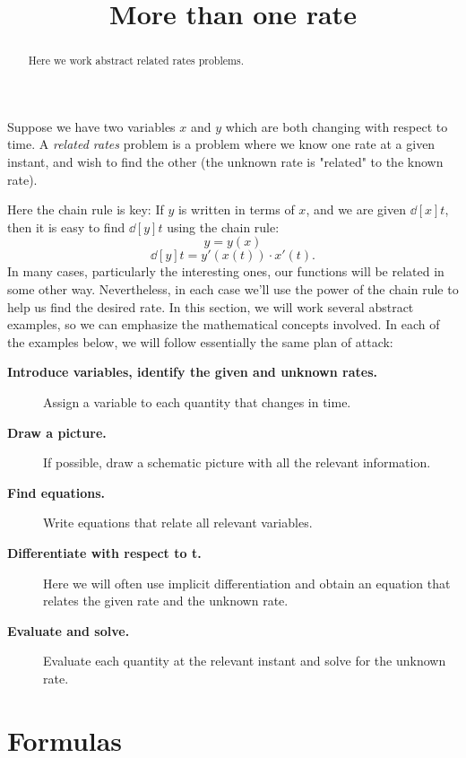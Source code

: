 \documentclass{ximera}
\title[Dig-In:]{More than one rate}
\begin{document}
\begin{abstract}
  Here we work abstract related rates problems.
\end{abstract}
\maketitle


Suppose we have two variables $x$ and $y$ which are both changing with
respect to time.  A \textit{related rates} problem is a problem where
we know one rate at a given instant, and wish to find the other (the unknown rate is "related" to the known rate).

Here the chain rule is key: If $y$ is written in terms of $x$, and we
are given $\dd[x]{t}$, then it is easy to find $\dd[y]{t}$ using the
chain rule:
\[
y=y(x)
\]
\[
\dd[y]{t}=y'(x(t))\cdot x'(t).
\]
In many cases, particularly the interesting ones, our functions will
be related in some other way. Nevertheless, in each case we'll use the
power of the chain rule to help us find the desired rate. In this
section, we will work several abstract examples, so we can emphasize
the mathematical concepts involved. In each of the examples below, we
will follow essentially the same plan of attack:



\begin{description}
\item[\textbf{Introduce variables, identify the given and unknown rates.}] Assign a variable to each quantity that changes in time.
\item[\textbf{Draw a picture.}] If possible, draw a schematic picture with all the relevant information. 
\item[\textbf{Find equations.}] Write equations that relate all
  relevant variables.
\item[\textbf{Differentiate with respect to t.}] Here we will often use
  implicit differentiation and obtain an equation that relates the given rate and the unknown rate. 
\item[\textbf{Evaluate and solve.}] Evaluate
each quantity at the relevant instant and solve for the unknown rate.

\end{description}




\section{Formulas}
\end{document}
